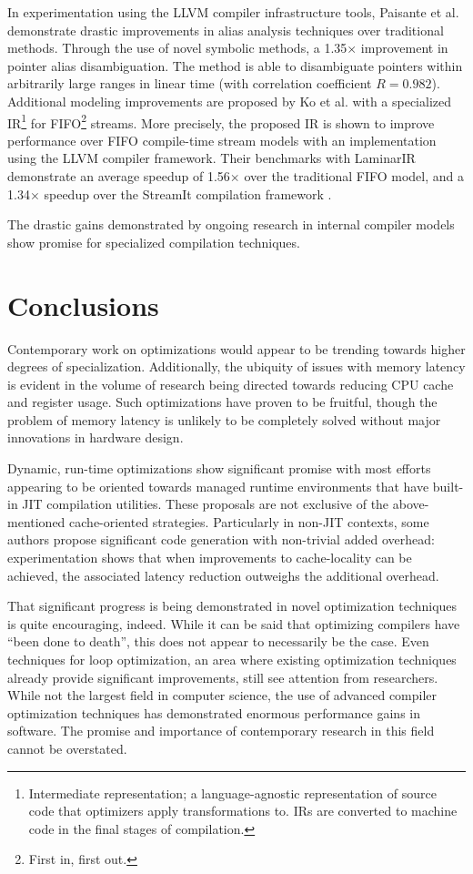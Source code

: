 \documentclass[nobib]{tufte-handout}
\begin{document}
In experimentation using the LLVM compiler infrastructure tools, Paisante et al. demonstrate drastic improvements in alias analysis techniques over traditional methods.  Through the use of novel symbolic methods, a 1.35$\times$ improvement\cite{Ko} in pointer alias disambiguation.  The method is able to disambiguate pointers within arbitrarily large ranges in linear time (with correlation coefficient $R = 0.982$)\cite{Ko}.  Additional modeling improvements are proposed by Ko et al. with a specialized IR\footnote{Intermediate representation; a language-agnostic representation of source code that optimizers apply transformations to.  IRs are converted to machine code in the final stages of compilation.} for FIFO\footnote{First in, first out.} streams.  More precisely, the proposed IR is shown to improve performance over FIFO compile-time stream models with an implementation using the LLVM compiler framework.  Their benchmarks with LaminarIR demonstrate an average speedup of 1.56$\times$ over the traditional FIFO model, and a 1.34$\times$ speedup over the StreamIt compilation framework \cite{Ko}.

The drastic gains demonstrated by ongoing research in internal compiler models show promise for specialized compilation techniques.

\section{Conclusions}
Contemporary work on optimizations would appear to be trending towards higher degrees of specialization.  Additionally, the ubiquity of issues with memory latency is evident in the volume of research being directed towards reducing CPU cache and register usage.  Such optimizations have proven to be fruitful, though the problem of memory latency is unlikely to be completely solved without major innovations in hardware design.  

Dynamic, run-time optimizations show significant promise with most efforts appearing to be oriented towards managed runtime environments that have built-in JIT compilation utilities.  These proposals are not exclusive of the above-mentioned cache-oriented strategies.  Particularly in non-JIT contexts, some authors propose significant code generation with non-trivial added overhead: experimentation shows that when improvements to cache-locality can be achieved, the associated latency reduction outweighs the additional overhead.  

That significant progress is being demonstrated in novel optimization techniques is quite encouraging, indeed.  While it can be said that optimizing compilers have ``been done to death'', this does not appear to necessarily be the case.  Even techniques for loop optimization, an area where existing optimization techniques already provide significant improvements, still see attention from researchers.  While not the largest field in computer science, the use of advanced compiler optimization techniques has demonstrated enormous performance gains in software.  The promise and importance of contemporary research in this field cannot be overstated.



\newpage
\nocite{*}


\end{document}
